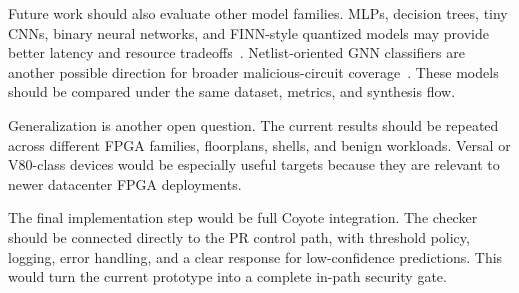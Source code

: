 Future work should also evaluate other model families. MLPs, decision trees, tiny CNNs, binary neural networks, and FINN-style quantized models may provide better latency and resource tradeoffs~\cite{blott2018finnr,coelho2020qkeras,han2016deepcompression}. Netlist-oriented GNN classifiers are another possible direction for broader malicious-circuit coverage~\cite{alrahis2024malignnoma}. These models should be compared under the same dataset, metrics, and synthesis flow.

Generalization is another open question. The current results should be repeated across different FPGA families, floorplans, shells, and benign workloads. Versal or V80-class devices would be especially useful targets because they are relevant to newer datacenter FPGA deployments.

The final implementation step would be full Coyote integration. The checker should be connected directly to the PR control path, with threshold policy, logging, error handling, and a clear response for low-confidence predictions. This would turn the current prototype into a complete in-path security gate.
